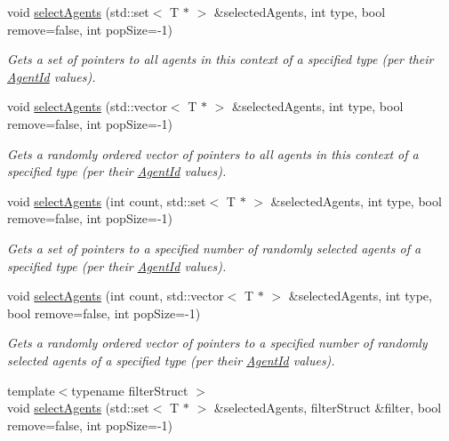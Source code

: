 \begin{DoxyCompactItemize}
void \hyperlink{classrepast_1_1_context_abf2012f09fb75bfdeb798431e63edfde}{select\-Agents} (std\-::set$<$ T $\ast$ $>$ \&selected\-Agents, int type, bool remove=false, int pop\-Size=-\/1)
\begin{DoxyCompactList}\small\item\em Gets a set of pointers to all agents in this context of a specified type (per their \hyperlink{classrepast_1_1_agent_id}{Agent\-Id} values). \end{DoxyCompactList}\item 
void \hyperlink{classrepast_1_1_context_af8ca3deb5e820bf84df1dd83fdd14f2d}{select\-Agents} (std\-::vector$<$ T $\ast$ $>$ \&selected\-Agents, int type, bool remove=false, int pop\-Size=-\/1)
\begin{DoxyCompactList}\small\item\em Gets a randomly ordered vector of pointers to all agents in this context of a specified type (per their \hyperlink{classrepast_1_1_agent_id}{Agent\-Id} values). \end{DoxyCompactList}\item 
void \hyperlink{classrepast_1_1_context_a8961d3bd4575afac3ef571166739ac39}{select\-Agents} (int count, std\-::set$<$ T $\ast$ $>$ \&selected\-Agents, int type, bool remove=false, int pop\-Size=-\/1)
\begin{DoxyCompactList}\small\item\em Gets a set of pointers to a specified number of randomly selected agents of a specified type (per their \hyperlink{classrepast_1_1_agent_id}{Agent\-Id} values). \end{DoxyCompactList}\item 
void \hyperlink{classrepast_1_1_context_aae94abf702a7223aaadc74da4f1fd639}{select\-Agents} (int count, std\-::vector$<$ T $\ast$ $>$ \&selected\-Agents, int type, bool remove=false, int pop\-Size=-\/1)
\begin{DoxyCompactList}\small\item\em Gets a randomly ordered vector of pointers to a specified number of randomly selected agents of a specified type (per their \hyperlink{classrepast_1_1_agent_id}{Agent\-Id} values). \end{DoxyCompactList}\item 
{\footnotesize template$<$typename filter\-Struct $>$ }\\void \hyperlink{classrepast_1_1_context_a926168c2e765e58473d901f56a6a42f7}{select\-Agents} (std\-::set$<$ T $\ast$ $>$ \&selected\-Agents, filter\-Struct \&filter, bool remove=false, int pop\-Size=-\/1)

\end{DoxyCompactItemize}
